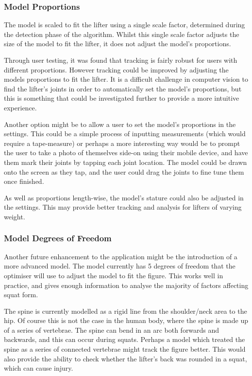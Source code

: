 \subsubsection{Model Proportions}

The model is scaled to fit the lifter using a single scale factor, determined during the detection phase of the algorithm. Whilst this single scale factor adjusts the size of the model to fit the lifter, it does not adjust the model's proportions.

Through user testing, it was found that tracking is fairly robust for users with different proportions. However tracking could be improved by adjusting the models proportions to fit the lifter. It is a difficult challenge in computer vision to find the lifter's joints in order to automatically set the model's proportions, but this is something that could be investigated further to provide a more intuitive experience.

Another option might be to allow a user to set the model's proportions in the settings. This could be a simple process of inputting measurements (which would require a tape-measure) or perhaps a more interesting way would be to prompt the user to take a photo of themselves side-on using their mobile device, and have them mark their joints by tapping each joint location. The model could be drawn onto the screen as they tap, and the user could drag the joints to fine tune them once finished.

As well as proportions length-wise, the model's stature could also be adjusted in the settings. This may provide better tracking and analysis for lifters of varying weight.

\subsubsection{Model Degrees of Freedom}

Another future enhancement to the application might be the introduction of a more advanced model. The model currently has 5 degrees of freedom that the optimiser will use to adjust the model to fit the figure. This works well in practice, and gives enough information to analyse the majority of factors affecting squat form.

The spine is currently modelled as a rigid line from the shoulder/neck area to the hip. Of course this is not the case in the human body, where the spine is made up of a series of vertebrae. The spine can bend in an arc both forwards and backwards, and this can occur during squats. Perhaps a model which treated the spine as a series of connected vertebrae might track the figure better. This would also provide the ability to check whether the lifter's back was rounded in a squat, which can cause injury.

